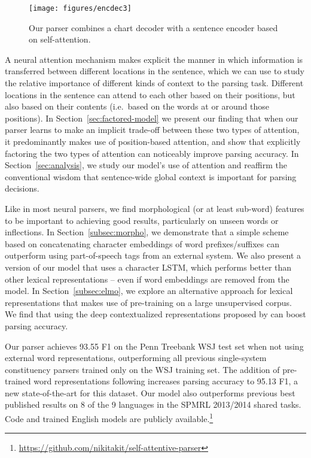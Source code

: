 \documentclass[11pt,a4paper]{article}
\begin{document}
\begin{figure}
  \centering
    \texttt{[image: figures/encdec3]}
    \caption{Our parser combines a chart decoder with a sentence encoder based on self-attention.}
    \label{fig:encdec}
\end{figure}

A neural attention mechanism makes explicit the manner in which information is transferred between different locations in the sentence, which we can use to study the relative importance of different kinds of context to the parsing task. Different locations in the sentence can attend to each other based on their positions, but also based on their contents (i.e.\ based on the words at or around those positions). In Section~\ref{sec:factored-model} we present our finding that when our parser learns to make an implicit trade-off between these two types of attention, it predominantly makes use of position-based attention, and show that explicitly factoring the two types of attention can noticeably improve parsing accuracy. In Section~\ref{sec:analysis}, we study our model's use of attention and reaffirm the conventional wisdom that sentence-wide global context is important for parsing decisions.

Like in most neural parsers, we find morphological (or at least sub-word) features to be important to achieving good results, particularly on unseen words or inflections. In Section~\ref{subsec:morpho}, we demonstrate that a simple scheme based on concatenating character embeddings of word prefixes/suffixes can outperform using part-of-speech tags from an external system. We also present a version of our model that uses a character LSTM, which performs better than other lexical representations -- even if word embeddings are removed from the model. In Section~\ref{subsec:elmo}, we explore an alternative approach for lexical representations that makes use of pre-training on a large unsupervised corpus. We find that using the deep contextualized representations proposed by \citet{peters_deep_2018} can boost parsing accuracy.

Our parser achieves 93.55 F1 on the Penn Treebank WSJ test set when not using external word representations, outperforming all previous single-system constituency parsers trained only on the WSJ training set. The addition of pre-trained word representations following \citet{peters_deep_2018} increases parsing accuracy to 95.13 F1, a new state-of-the-art for this dataset. Our model also outperforms previous best published results on 8 of the 9 languages in the SPMRL 2013/2014 shared tasks. Code and trained English models are publicly available.\footnote{\href{https://github.com/nikitakit/self-attentive-parser}{https://github.com/nikitakit/self-attentive-parser}}
\end{document}
